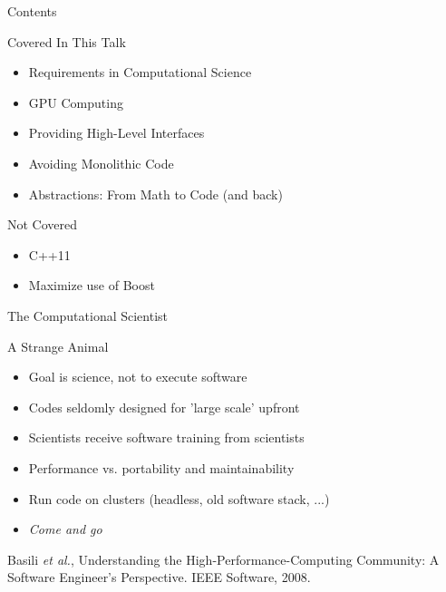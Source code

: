 \begin{frame}{Contents}

  \begin{block}{Covered In This Talk}
   \begin{itemize}
    \item Requirements in Computational Science
    \item GPU Computing
    \item Providing High-Level Interfaces
    \item Avoiding Monolithic Code
    \item Abstractions: From Math to Code (and back)
   \end{itemize}
  \end{block}

  \begin{block}{Not Covered}
   \begin{itemize}
    \item C++11
    \item Maximize use of Boost
   \end{itemize}
  \end{block}

\end{frame}




\begin{frame}{The Computational Scientist}
  \begin{block}{A Strange Animal}
   \begin{itemize}
    \item Goal is science, not to execute software
    \item Codes seldomly designed for 'large scale' upfront
    \item Scientists receive software training from scientists
    \item Performance vs. portability and maintainability
    \item Run code on clusters (headless, old software stack, ...)
    \item \emph{Come and go}
   \end{itemize}
  \end{block}

  \vspace*{2cm}
  \begin{block}{}
   \footnotesize Basili \textit{et al.}, Understanding the High-Performance-Computing Community: A Software Engineer's Perspective. IEEE Software, 2008.
  \end{block}

\end{frame}



